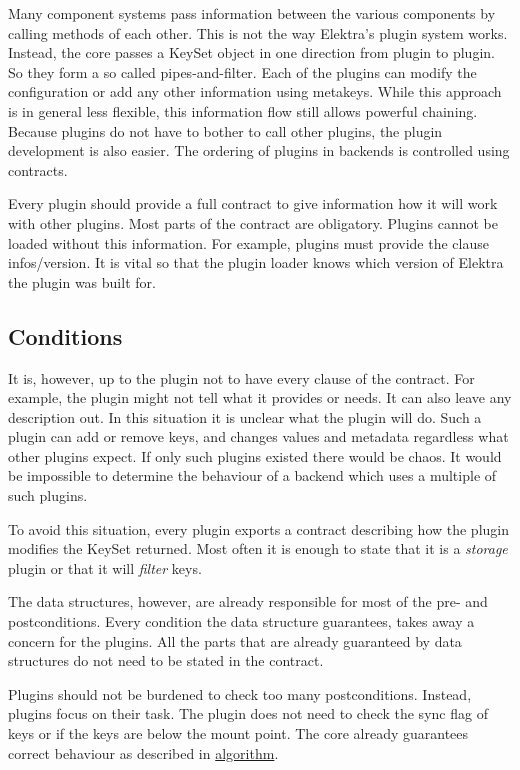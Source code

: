 Many component systems pass information between the various components by calling methods of each other. This is not the way Elektra's plugin system works. Instead, the core passes a {\ttfamily Key\+Set} object in one direction from plugin to plugin. So they form a so called pipes-\/and-\/filter. Each of the plugins can modify the configuration or add any other information using metakeys. While this approach is in general less flexible, this information flow still allows powerful chaining. Because plugins do not have to bother to call other plugins, the plugin development is also easier. The ordering of plugins in backends is controlled using contracts.

Every plugin should provide a full contract to give information how it will work with other plugins. Most parts of the contract are obligatory. Plugins cannot be loaded without this information. For example, plugins must provide the clause {\ttfamily infos/version}. It is vital so that the plugin loader knows which version of Elektra the plugin was built for.

\subsection*{Conditions}

It is, however, up to the plugin not to have every clause of the contract. For example, the plugin might not tell what it provides or needs. It can also leave any description out. In this situation it is unclear what the plugin will do. Such a plugin can add or remove keys, and changes values and metadata regardless what other plugins expect. If only such plugins existed there would be chaos. It would be impossible to determine the behaviour of a backend which uses a multiple of such plugins.

To avoid this situation, every plugin exports a contract describing how the plugin modifies the {\ttfamily Key\+Set} {\ttfamily returned}. Most often it is enough to state that it is a {\itshape storage} plugin or that it will {\itshape filter} keys.

The data structures, however, are already responsible for most of the pre-\/ and postconditions. Every condition the data structure guarantees, takes away a concern for the plugins. All the parts that are already guaranteed by data structures do not need to be stated in the contract.

Plugins should not be burdened to check too many postconditions. Instead, plugins focus on their task. The plugin does not need to check the sync flag of keys or if the keys are below the mount point. The core already guarantees correct behaviour as described in \hyperlink{md_doc_help_elektra-algorithm_doc_help_elektra-algorithm_md}{algorithm}.

